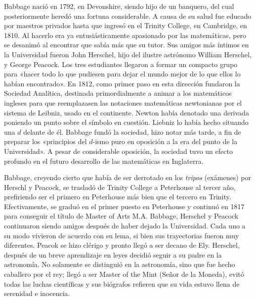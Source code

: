 \documentclass[a4paper, 12pt]{article}
\begin{document}
Babbage nació en 1792, en Devonshire, siendo hijo de un banquero, del cual posteriormente heredó una fortuna considerable. A causa de su salud fue educado por maestros privados hasta que ingresó en el Trinity College, en Cambridge, en 1810. Al hacerlo era ya entusiásticamente apasionado por las matemáticas, pero se desanimó al encontrar que sabía más que su tutor. Sus amigos más íntimos en la Universidad fueron John Herschel, hijo del ilustre astrónomo William Herschel, y George Peacock. Los tres estudiantes llegaron a formar un compacto grupo para «hacer todo lo que pudiesen para dejar el mundo mejor de lo que ellos lo habían encontrado». En 1812, como primer paso en esta dirección fundaron la Sociedad Analítica, destinada primordialmente a animar a los matemáticos ingleses para que reemplazasen las notaciones matemáticas newtonianas por el sistema de Leibniz, usado en el continente. Newton había denotado una derivada poniendo un punto sobre el símbolo en cuestión. Liebniz lo había hecho situando una $d$ delante de él. Babbage fundó la sociedad, hizo notar más tarde, a fin de preparar los «principios del $d$-ismo puro en oposición a la era del punto de la Universidad». A pesar de considerable oposición, la sociedad tuvo un efecto profundo en el futuro desarrollo de las matemáticas en Inglaterra.

Babbage, creyendo cierto que había de ser derrotado en los {\it tripos} (exámenes) por Herschl y Peacock, se trasladó de Trinity College a Peterhouse al tercer año, prefiriendo ser el primero en Peterhouse más bien que el tercero en Trinity. Efectivamente, se graduó en el primer puesto en Peterhouse y continuó en 1817 para conseguir el título de Master of Arts M.A. Babbage, Herschel y Peacock continuaron siendo amigos después de haber dejado la Universidad. Cada uno a su modo vivieron de acuerdo con su lema, si bien sus trayectorias fueron muy diferentes. Peacok se hizo clérigo y pronto llegó a ser decano de Ely. Herschel, después de un breve aprendizaje en leyes decidió seguir a su padre en la astronomía. No solamente se distinguió en la astronomía, sino que fue hecho caballero por el rey; llegó a ser Master of the Mint (Señor de la Moneda), evitó todas las luchas científicas y sus biógrafos refieren que su vida estuvo llena de serenidad e inocencia.
\end{document}
